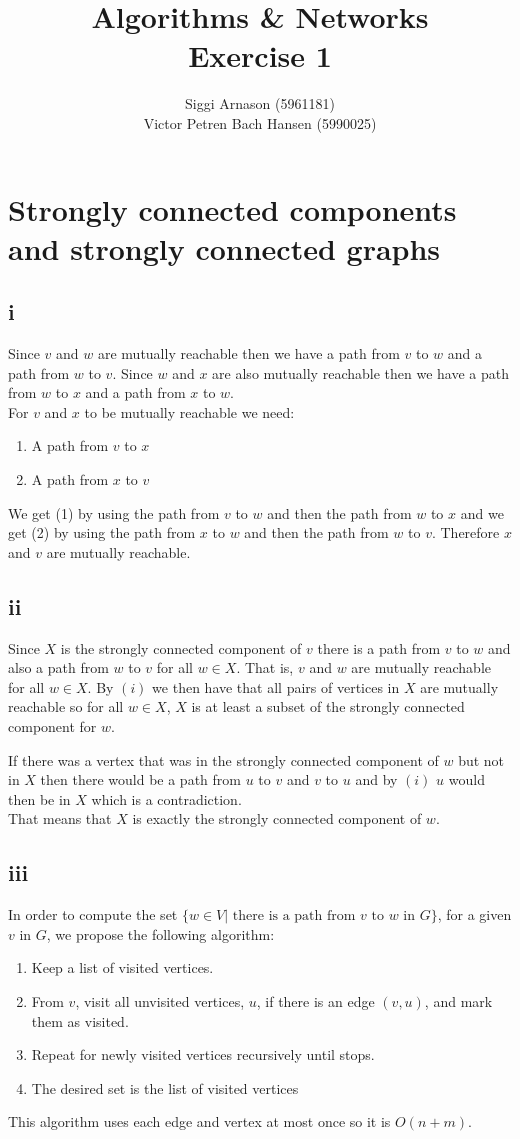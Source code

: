 \documentclass[a4paper]{article}
\author{Siggi Arnason (5961181) \\ Victor Petren Bach Hansen (5990025)}
\title{Algorithms \& Networks \\ Exercise 1}
\begin{document}
\maketitle
\section{Strongly connected components and strongly connected graphs}
\subsection*{i}
Since $v$ and $w$ are mutually reachable then we have a path from $v$ to $w$ and a path from $w$ to $v$. Since $w$ and $x$ are also mutually reachable then we have a path from $w$ to $x$ and a path from $x$ to $w$.\\
For $v$ and $x$ to be mutually reachable we need:
\begin{enumerate}
  \item A path from $v$ to $x$
  \item A path from $x$ to $v$
\end{enumerate}
We get (1) by using the path from $v$ to $w$ and then the path from $w$ to $x$ and we get (2) by using the path from $x$ to $w$ and then the path from $w$ to $v$. Therefore $x$ and $v$ are mutually reachable.

\subsection*{ii}
Since $X$ is the strongly connected component of $v$ there is a path from $v$ to $w$ and also a path from $w$ to $v$ for all $w \in X$. That is, $v$ and $w$ are mutually reachable for all $w \in X$. By $(i)$ we then have that all pairs of vertices in $X$ are mutually reachable so for all $w \in X$, $X$ is at least a subset of the strongly connected component for $w$.

If there was a vertex that was in the strongly connected component of $w$ but not in $X$ then there would be a path from $u$ to $v$ and $v$ to $u$ and by $(i)$ $u$ would then be in $X$ which is a contradiction. \\
That means that $X$ is exactly the strongly connected component of $w$.
\subsection*{iii}
In order to compute the set $\{w \in V | \mbox{ there is a path from $v$ to $w$ in $G$}\}$, for a given $v$ in $G$, we propose the following algorithm:
\begin{enumerate}
  \item Keep a list of visited vertices.
  \item From $v$, visit all unvisited vertices, $u$, if there is an edge $(v,u)$, and mark them as visited.
  \item Repeat for newly visited vertices recursively until stops.
  \item The desired set is the list of visited vertices
\end{enumerate}
This algorithm uses each edge and vertex at most once so it is $O(n + m)$.
\end{document}
